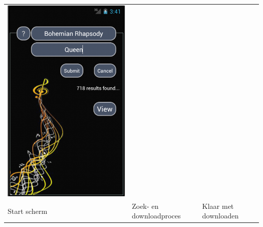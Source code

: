 \documentclass[11pt,a4paper]{article}
\begin{document}
\begin{tabular}{l l l}
	\includegraphics[scale=0.4]{GUI_0124_startresults.png} \\
	
	Start scherm & Zoek- en downloadproces & Klaar met downloaden \\[5ex]
	

\end{tabular}
\end{document}

